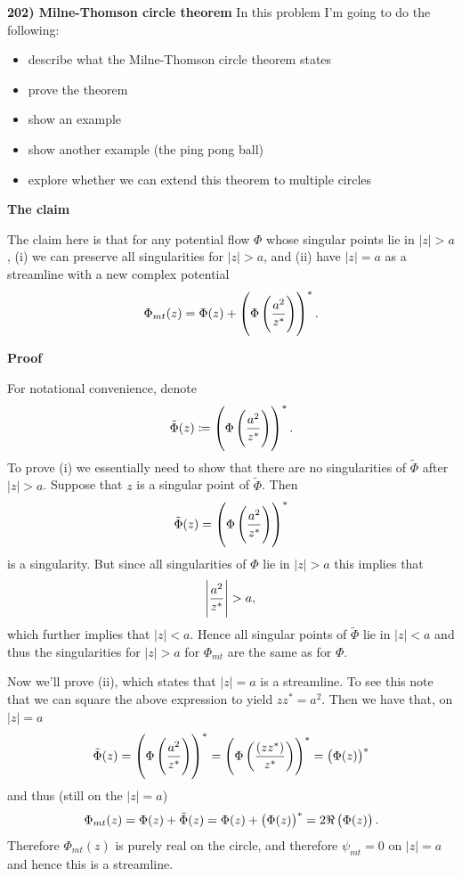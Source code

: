 \documentclass{article}
\def\ti#1{\tilde{#1}}
\begin{document}
\newpage

\textbf{202) Milne-Thomson circle theorem}
In this problem I'm going to do the following:
%
\begin{itemize}
    \item describe what the Milne-Thomson circle theorem states
    \item prove the theorem
    \item show an example
    \item show another example (the ping pong ball)
    \item explore whether we can extend this theorem to multiple circles
\end{itemize}

\textbf{The claim}

The claim here is that for any potential flow $\Phi$ whose singular
points lie in $|z| > a$, (i) we can preserve all singularities for $|z|
> a$, and (ii) have $|z| = a$ as a streamline with a new complex
potential
%
\begin{equation*}
    \Phi_{mt}(z) = \Phi(z) + \del{\Phi \del{\frac{a^2}{z^*}}}^*
    .
\end{equation*}

\textbf{Proof}

For notational convenience, denote
%
\begin{equation*}
    \ti{\Phi}(z) \coloneqq \del{\Phi \del{\frac{a^2}{z^*}}}^*
    .
\end{equation*}
%
To prove (i) we essentially need to show that there are no singularities
of $\ti\Phi$ after $|z| > a$. Suppose that $z$ is a singular point of
$\ti\Phi$. Then
%
\begin{equation*}
    \ti\Phi(z) = \del{\Phi \del{\frac{a^2}{z^*}}}^*
\end{equation*}
%
is a singularity. But since all singularities of $\Phi$ lie in $|z| >
a$ this implies that
%
\begin{equation*}
    \envert{\frac{a^2}{z^*}} > a
    ,
\end{equation*}
%
which further implies that $|z| < a$. Hence all singular points of
$\ti\Phi$ lie in $|z| < a$ and thus the singularities for $|z| > a$ for
$\Phi_{mt}$ are the same as for $\Phi$.

Now we'll prove (ii), which states that $|z| = a$ is a streamline. To
see this note that we can square the above expression to yield $z z^* =
a^2$. Then we have that, on $|z| = a$
%
\begin{equation*}
    \ti\Phi(z)
        = \del{\Phi \del{\frac{a^2}{z^*}}}^*
        = \del{\Phi \del{\frac{(z z^*)}{z^*}}}^*
        = \del{\Phi(z)}^*
\end{equation*}
%
and thus (still on the $|z| = a$)
%
\begin{equation*}
    \Phi_{mt}(z) = \Phi(z) + \ti\Phi(z) = \Phi(z) + \del{\Phi(z)}^* = 2 \Re\del{\Phi(z)}
    .
\end{equation*}
%
Therefore $\Phi_{mt}(z)$ is purely real on the circle, and therefore
$\psi_{mt} = 0$ on $|z| = a$ and hence this is a streamline.
\end{document}
